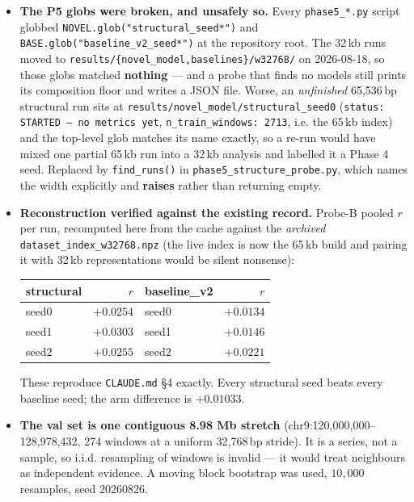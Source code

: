 \documentclass[11pt,a4paper]{article}
\newcommand{\code}[1]{\texttt{\small #1}}
\begin{document}
\begin{itemize}

\item \textbf{The P5 globs were broken, and unsafely so.} Every
\code{phase5\_*.py} script globbed \code{NOVEL.glob("structural\_seed*")} and
\code{BASE.glob("baseline\_v2\_seed*")} at the repository root. The 32\,kb runs
moved to \code{results/\{novel\_model,baselines\}/w32768/} on 2026-08-18, so
those globs matched \textbf{nothing} --- and a probe that finds no models still
prints its composition floor and writes a JSON file. Worse, an \emph{unfinished}
65{,}536\,bp structural run sits at
\code{results/novel\_model/structural\_seed0} (\code{status: STARTED -- no
metrics yet}, \code{n\_train\_windows: 2713}, i.e. the 65\,kb index) and the
top-level glob matches its name exactly, so a re-run would have mixed one
partial 65\,kb run into a 32\,kb analysis and labelled it a Phase 4 seed.
Replaced by \code{find\_runs()} in \code{phase5\_structure\_probe.py}, which
names the width explicitly and \textbf{raises} rather than returning empty.

\item \textbf{Reconstruction verified against the existing record.} Probe-B
pooled $r$ per run, recomputed here from the cache against the \emph{archived}
\code{dataset\_index\_w32768.npz} (the live index is now the 65\,kb build and
pairing it with 32\,kb representations would be silent nonsense):

\begin{center}
\begin{tabular}{lr@{\qquad}lr}
\toprule
structural & $r$ & baseline\_v2 & $r$ \\
\midrule
seed0 & $+0.0254$ & seed0 & $+0.0134$ \\
seed1 & $+0.0303$ & seed1 & $+0.0146$ \\
seed2 & $+0.0255$ & seed2 & $+0.0221$ \\
\bottomrule
\end{tabular}
\end{center}

These reproduce \code{CLAUDE.md} \S4 exactly. Every structural seed beats every
baseline seed; the arm difference is $+0.01033$.

\item \textbf{The val set is one contiguous 8.98 Mb stretch}
(chr9:120{,}000{,}000--128{,}978{,}432, 274 windows at a uniform 32{,}768\,bp
stride). It is a series, not a sample, so i.i.d. resampling of windows is
invalid --- it would treat neighbours as independent evidence. A moving block
bootstrap was used, $10{,}000$ resamples, seed 20260826.


\end{itemize}
\end{document}

